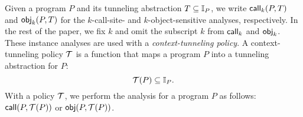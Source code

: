 Given  a program $P$ and 
its tunneling abstraction $T \subseteq \mathbb{I}_P$, 
we write ${\sf call}_k(P, T)$ and
${\sf obj}_k(P, T)$ for the $k$-call-site- and
$k$-object-sensitive analyses, respectively. In the rest of the paper, we fix $k$ and omit the subscript $k$ from ${\sf call}_k$ and ${\sf obj}_k$. 
%
%
%
These instance analyses are used with a {\em context-tunneling policy}. 
A context-tunneling policy $\mathcal{T}$ is a function that maps a program $P$ into
a tunneling abstraction for $P$: 
\[
  \mathcal{T}(P) \subseteq \mathbb{I}_P.
\]
With a policy $\mathcal{T}$, 
we  perform the analysis for a program $P$ as follows: ${\sf call}(P, \mathcal{T}(P))$ or ${\sf obj}(P, \mathcal{T}(P))$. 



